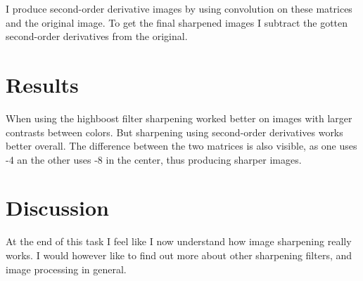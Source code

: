 \documentclass[8pt,letterpaper]{article}
\begin{document}
I produce second-order derivative images by using convolution on these matrices and the original image. To get the final sharpened images I subtract the gotten second-order derivatives from the original.

\section{Results}
When using the highboost filter sharpening worked better on images with larger contrasts between colors. But sharpening using second-order derivatives works better overall. The difference between the two matrices is also visible, as one uses -4 an the other uses -8 in the center, thus producing sharper images.

\section{Discussion}
At the end of this task I feel like I now understand how image sharpening really works. I would however like to find out more about other sharpening filters, and image processing in general.
	
	
	
\end{document}

